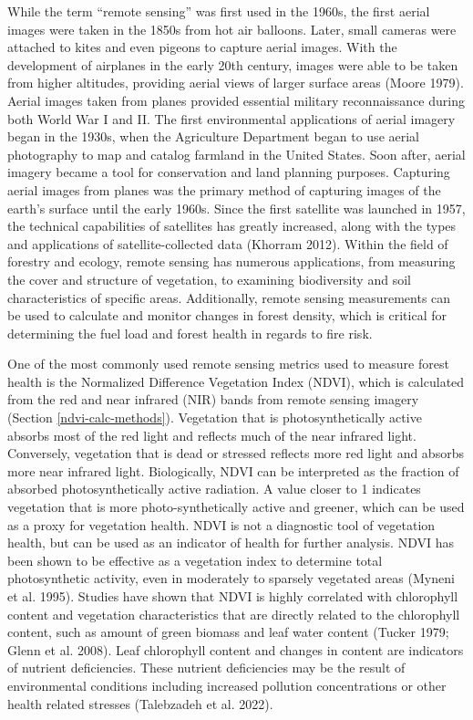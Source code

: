 \documentclass[12pt,twoside]{reedthesis}
\begin{document}
While the term ``remote sensing'' was first used in the 1960s, the first
aerial images were taken in the 1850s from hot air balloons. Later,
small cameras were attached to kites and even pigeons to capture aerial
images. With the development of airplanes in the early 20th century,
images were able to be taken from higher altitudes, providing aerial
views of larger surface areas (Moore 1979). Aerial images taken from
planes provided essential military reconnaissance during both World War
I and II. The first environmental applications of aerial imagery began
in the 1930s, when the Agriculture Department began to use aerial
photography to map and catalog farmland in the United States. Soon
after, aerial imagery became a tool for conservation and land planning
purposes. Capturing aerial images from planes was the primary method of
capturing images of the earth's surface until the early 1960s. Since the
first satellite was launched in 1957, the technical capabilities of
satellites has greatly increased, along with the types and applications
of satellite-collected data (Khorram 2012). Within the field of forestry
and ecology, remote sensing has numerous applications, from measuring
the cover and structure of vegetation, to examining biodiversity and
soil characteristics of specific areas. Additionally, remote sensing
measurements can be used to calculate and monitor changes in forest
density, which is critical for determining the fuel load and forest
health in regards to fire risk.

One of the most commonly used remote sensing metrics used to measure
forest health is the Normalized Difference Vegetation Index (NDVI),
which is calculated from the red and near infrared (NIR) bands from
remote sensing imagery (Section \ref{ndvi-calc-methods}). Vegetation
that is photosynthetically active absorbs most of the red light and
reflects much of the near infrared light. Conversely, vegetation that is
dead or stressed reflects more red light and absorbs more near infrared
light. Biologically, NDVI can be interpreted as the fraction of absorbed
photosynthetically active radiation. A value closer to 1 indicates
vegetation that is more photo-synthetically active and greener, which
can be used as a proxy for vegetation health. NDVI is not a diagnostic
tool of vegetation health, but can be used as an indicator of health for
further analysis. NDVI has been shown to be effective as a vegetation
index to determine total photosynthetic activity, even in moderately to
sparsely vegetated areas (Myneni et al. 1995). Studies have shown that NDVI is
highly correlated with chlorophyll content and vegetation
characteristics that are directly related to the chlorophyll content,
such as amount of green biomass and leaf water content (Tucker 1979; Glenn et al. 2008). Leaf chlorophyll content and changes in content are
indicators of nutrient deficiencies. These nutrient deficiencies may be
the result of environmental conditions including increased pollution
concentrations or other health related stresses (Talebzadeh et al. 2022).
\end{document}
